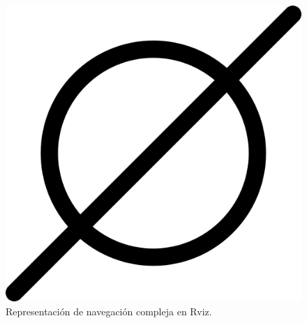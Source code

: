 \begin{figure}[htbp]
\begin{minipage}[b]{0.45\textwidth}
    \includegraphics[width=\textwidth]{images/poner_foto.png}
    \caption{Representación de navegación compleja en Rviz.}
    \label{fig:navegacion_cuadrado_rviz}
  \end{minipage}
\end{figure}

